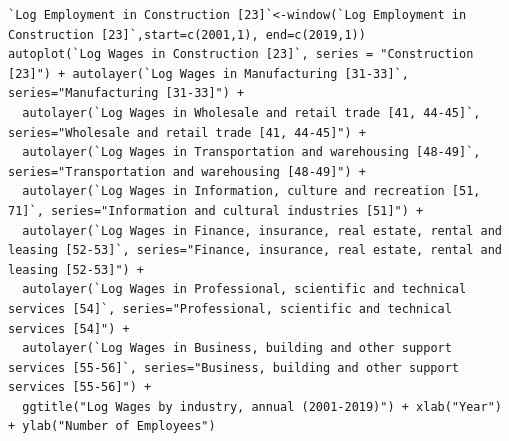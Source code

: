 \documentclass[12pt]{article}
\begin{document}
\begin{verbatim}
`Log Employment in Construction [23]`<-window(`Log Employment in Construction [23]`,start=c(2001,1), end=c(2019,1)) 
autoplot(`Log Wages in Construction [23]`, series = "Construction [23]") + autolayer(`Log Wages in Manufacturing [31-33]`, series="Manufacturing [31-33]") +
  autolayer(`Log Wages in Wholesale and retail trade [41, 44-45]`, series="Wholesale and retail trade [41, 44-45]") +
  autolayer(`Log Wages in Transportation and warehousing [48-49]`, series="Transportation and warehousing [48-49]") +
  autolayer(`Log Wages in Information, culture and recreation [51, 71]`, series="Information and cultural industries [51]") +
  autolayer(`Log Wages in Finance, insurance, real estate, rental and leasing [52-53]`, series="Finance, insurance, real estate, rental and leasing [52-53]") +
  autolayer(`Log Wages in Professional, scientific and technical services [54]`, series="Professional, scientific and technical services [54]") +
  autolayer(`Log Wages in Business, building and other support services [55-56]`, series="Business, building and other support services [55-56]") +
  ggtitle("Log Wages by industry, annual (2001-2019)") + xlab("Year") + ylab("Number of Employees")

\end{verbatim}
\end{document}
